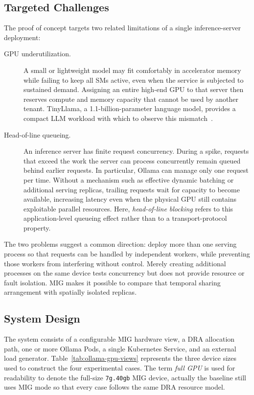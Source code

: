 \subsection{Targeted Challenges}
\label{subsec:multi-ollama-problem}

The proof of concept targets two related limitations of a single inference-server deployment:

\begin{description}
    \item[GPU underutilization.] A small or lightweight model may fit comfortably in accelerator memory while failing to keep all SMs active, even when the service is subjected to sustained demand. Assigning an entire high-end GPU to that server then reserves compute and memory capacity that cannot be used by another tenant. TinyLlama, a 1.1-billion-parameter language model, provides a compact LLM workload with which to observe this mismatch~\cite{zhang2024tinyllama}.
    \item[Head-of-line queueing.] An inference server has finite request concurrency. During a spike, requests that exceed the work the server can process concurrently remain queued behind earlier requests. In particular, Ollama can manage only one request per time. Without a mechanism such as effective dynamic batching or additional serving replicas, trailing requests wait for capacity to become available, increasing latency even when the physical GPU still contains exploitable parallel resources. Here, \emph{head-of-line blocking} refers to this application-level queueing effect rather than to a transport-protocol property.
\end{description}

The two problems suggest a common direction: deploy more than one serving process so that requests can be handled by independent workers, while preventing those workers from interfering without control. Merely creating additional processes on the same device tests concurrency but does not provide resource or fault isolation. MIG makes it possible to compare that temporal sharing arrangement with spatially isolated replicas.

\subsection{System Design}
\label{subsec:multi-ollama-architecture}

The system consists of a configurable MIG hardware view, a DRA allocation path, one or more Ollama Pods, a single Kubernetes Service, and an external load generator. Table~\ref{tab:ollama-gpu-views} represents the three device sizes used to construct the four experimental cases. The term \emph{full GPU} is used for readability to denote the full-size \texttt{7g.40gb} MIG device, actually the baseline still uses MIG mode so that every case follows the same DRA resource model.

